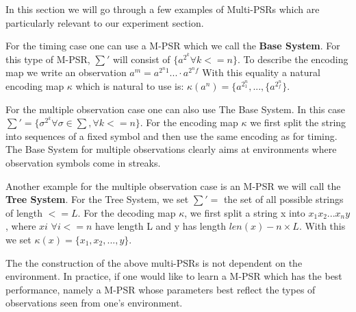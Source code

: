
In this section we will go through a few examples of Multi-PSRs which are particularly relevant to our experiment section. 

For the timing case one can use a M-PSR which we call the \textbf{Base System}. For this type of M-PSR, $\sum'$ will consist of $\{a^{2^k} \forall k <= n\}$. To describe the encoding map we write an observation $a^m = a^{2^n1} ... \cdot a^{2^nf}$  With this equality a natural encoding map $\kappa$ which is natural to use is: $\kappa(a^n) = \{a^{2^n_1},...,\{a^{2^n_f}\}$. 

For the multiple observation case one can also use The Base System. In this case $\sum' = \{\sigma^{2^k}\forall \sigma \in \sum, \forall k <= n\}$. For the encoding map $\kappa$ we first split the string into sequences of a fixed symbol and then use the same encoding as for timing. The Base System for multiple observations clearly aims at environments where observation symbols come in streaks.
 
Another example for the multiple observation case is an M-PSR we will call the \textbf{Tree System}. For the Tree System, we set $\sum'=$ the set of all possible strings of length $<= L$. For the decoding map $\kappa$, we first split a string x into $x_1x_2...x_ny$, where $xi$ $\forall i<=n$ have length L and y has length $len(x) - n \times L$. With this we set $\kappa(x) = \{x_1,x_2,...,y\}$.

The the construction of the above multi-PSRs is not dependent on the environment. In practice, if one would like to learn a M-PSR which has the best performance, namely a M-PSR whose parameters best reflect the types of observations seen from one's environment. 
